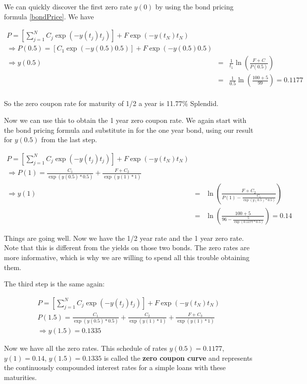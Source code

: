 \documentclass{tran-l}
\theoremstyle{definition}
\theoremstyle{remark}
\numberwithin{equation}{subsection}
\begin{document}
We can quickly discover the first zero rate $y(0)$ by using the bond pricing formula \ref{bondPrice}. We have

\begin{eqnarray*}
P = \left[\sum_{j=1}^N C_j\exp(-y(t_j)t_j)\right] + F \exp(-y(t_N)t_N) \\
\Rightarrow P(0.5) = \left[C_1\exp(-y(0.5)0.5)\right] + F \exp(-y(0.5)0.5) \\
\Rightarrow y(0.5) &=& \frac{1}{t_1}\ln\left(\frac{F+C}{P(0.5)}\right) \\
&=& \frac{1}{0.5}\ln\left(\frac{100+5}{99}\right) = 0.1177 \\
\end{eqnarray*}

So the zero coupon rate for maturity of 1/2 a year is 11.77\% Splendid.

 Now we can use this to obtain the 1 year zero coupon rate. We again start with the bond pricing formula and substitute in for the one year bond, using our result for $y(0.5)$ from the last step.

\begin{eqnarray*}
P = \left[\sum_{j=1}^N C_j\exp(-y(t_j)t_j)\right] + F \exp(-y(t_N)t_N)\\
\Rightarrow P(1) = \frac{C_1}{\exp(y(0.5)*0.5)} +\frac{F+C_2}{\exp(y(1)*1)}\\
\Rightarrow y(1) &=& \ln \left(\frac{F+C_2}{P(1)-\frac{C_1}{\exp(y(0.5)*0.5)}} \right)\\
 &=& \ln \left(\frac{100+5}{96-\frac{5}{\exp(0.1177*0.5)}} \right) = 0.14
\end{eqnarray*}

Things are going well. Now we have the 1/2 year rate and the 1 year zero rate. Note that this is different from the yields on those two bonds. The zero rates are more informative, which is why we are willing to spend all this trouble obtaining them.

The third step is the same again:

\begin{eqnarray*}
P = \left[\sum_{j=1}^N C_j\exp(-y(t_j)t_j)\right] + F \exp(-y(t_N)t_N)\\
P(1.5) = \frac{C_1}{\exp(y(0.5)*0.5)} +\frac{C_2}{\exp(y(1)*1)}+\frac{F+C_3}{\exp(y(1)*1)}\\
\Rightarrow y(1.5) = 0.1335
\end{eqnarray*}

Now we have all the zero rates. This schedule of rates $y(0.5) = 0.1177$, $y(1)=0.14$, $y(1.5) = 0.1335$ is called the \textbf{zero coupon curve} and represents the continuously compounded interest rates for a simple loans with these maturities.
\end{document}
